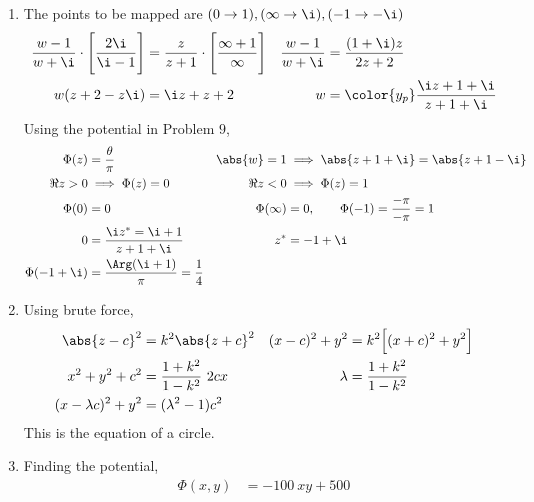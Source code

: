 \begin{enumerate}
    \item The points to be mapped are $ (0 \to 1), (\infty \to \i), (-1 \to -\i) $
          \begin{align}
              \frac{w - 1}{w + \i} \cdot \Bigg[\frac{2\i}{\i - 1}\Bigg]
                                   & = \frac{z}{z + 1} \cdot
              \Bigg[ \frac{\infty + 1}{\infty}
              \Bigg]               &
              \frac{w - 1}{w + \i} & = \frac{(1+\i)z}{2z + 2}                         \\
              w(z + 2 - z\i)       & = \i z + z + 2                                 &
              w                    & = \color{y_p} \frac{\i z + 1 + \i}{z + 1 + \i}
          \end{align}
          Using the potential in Problem $ 9 $,
          \begin{align}
              \Phi(z)       & = \frac{\theta}{\pi}                         &
              \abs{w} = 1   & \implies \abs{z + 1 + \i} = \abs{z + 1 - \i}   \\
              \Re{z} > 0    & \implies \Phi(z) = 0                         &
              \Re{z} < 0    & \implies \Phi(z) = 1                           \\
              \Phi(0)       & = 0                                          &
              \Phi(\infty)  & = 0, \qquad \Phi(-1) = \frac{-\pi}{-\pi} = 1   \\
              0             & = \frac{\i z^* = \i + 1}{z + 1 + \i}         &
              z^*           & = -1 + \i                                      \\
              \Phi(-1 + \i) & = \frac{\Arg(\i + 1)}{\pi} = \frac{1}{4}
          \end{align}

    \item Using brute force,
          \begin{align}
              \abs{z - c}^2           & = k^2 \abs{z + c}^2             &
              (x-c)^2 + y^2           & = k^2 \Big[(x + c)^2 + y^2\Big]   \\
              x^2 + y^2 + c^2         & = \frac{1 + k^2}{1 - k^2}\ 2cx  &
              \lambda                 & = \frac{1+k^2}{1 - k^2}           \\
              (x - \lambda c)^2 + y^2 & = (\lambda^2 - 1)c^2
          \end{align}
          This is the equation of a circle.

    \item Finding the potential,
          \begin{align}
              \Phi(x, y) & = -100\ xy + 500
          \end{align}


\end{enumerate}
